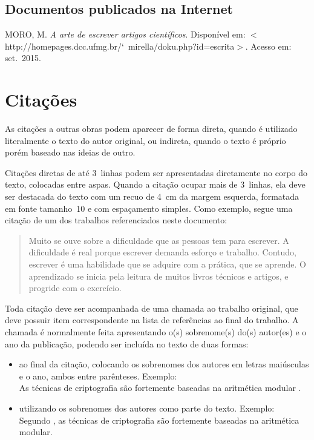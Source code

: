 \documentclass{ifsultcc}
\begin{document}
\subsection{Documentos publicados na Internet}
\begin{flushleft}
	MORO, M\@. \emph{A arte de escrever artigos científicos}. Disponível em:
  $<$http://homepages.dcc.ufmg.br/{\char`~}mirella/doku.php?id=escrita$>$.  Acesso em: set.~2015.
\end{flushleft}

\section{Citações}
As citações a outras obras podem aparecer de forma direta, quando é utilizado literalmente o texto do autor original, ou indireta, quando o texto é próprio porém baseado nas ideias de outro.

Citações diretas de até 3~linhas podem ser apresentadas diretamente no corpo do texto, colocadas entre aspas.  Quando a citação ocupar mais de 3~linhas, ela deve ser destacada do texto com um recuo de 4~cm da margem esquerda, formatada em fonte tamanho~10 e com espaçamento simples.  Como exemplo, segue uma citação de um dos trabalhos referenciados neste documento:
\begin{quote}
Muito se ouve sobre a dificuldade que as pessoas tem para escrever. A dificuldade é real porque escrever demanda esforço e trabalho. Contudo, escrever é uma habilidade que se adquire com a prática, que se aprende. O aprendizado se inicia pela leitura de muitos livros técnicos e artigos, e progride com o exercício. \cite{Hexsel04}
\end{quote}

Toda citação deve ser acompanhada de uma chamada ao trabalho original, que deve possuir item correspondente na lista de referências ao final do trabalho.  A chamada é normalmente feita apresentando o(s) sobrenome(s) do(s) autor(es) e o ano da publicação, podendo ser incluída no texto de duas formas: 
\begin{itemize}
	\item ao final da citação, colocando os sobrenomes dos autores em letras maiúsculas e o ano, ambos entre parênteses.  Exemplo:\\[2ex]
	As técnicas de criptografia são fortemente baseadas na aritmética modular \cite{Stallings14}.
	\item utilizando os sobrenomes dos autores como parte do texto.  Exemplo:\\[2ex]
	Segundo \citet*{Stallings14}, as técnicas de criptografia são fortemente baseadas na aritmética modular.
\end{itemize}
\end{document}
